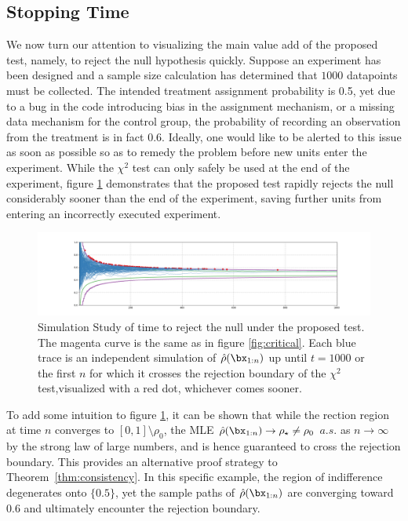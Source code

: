 \documentclass[11pt]{article}
\begin{document}
  \subsection{Stopping Time}
  We now turn our attention to visualizing the main value add of the proposed test, namely, to reject the null hypothesis quickly.
Suppose an experiment has been designed and a sample size calculation has determined that $1000$ datapoints must be collected.
The intended treatment assignment probability is 0.5, yet due to a bug in the code introducing bias in the assignment mechanism, or a missing data mechanism for the control group, the probability of recording an observation from the treatment is in fact 0.6.
Ideally, one would like to be alerted to this issue as soon as possible so as to remedy the problem before new units enter the experiment.
While the $\chi^2$ test can only safely be used at the end of the experiment,
  figure \ref{fig:ssrm_reject} demonstrates that the proposed test rapidly rejects the null considerably sooner than the end of the experiment, saving further units from entering an incorrectly executed experiment.
      \begin{figure}[H]
  \centering
  \includegraphics[scale=0.35]{images/ssrm_reject.png}
  \caption{Simulation Study of time to reject the null under the proposed test.
The magenta curve is the same as in figure \ref{fig:critical}.
Each blue trace is an independent simulation of $\hat{\rho}(\bx_{1:n})$ up until $t=1000$ or the first $n$ for which it crosses the rejection boundary of the $\chi^2$ test,visualized with a red dot, whichever comes sooner.
}
    \label{fig:ssrm_reject}
  \end{figure}
  \noindent To add some intuition to figure \ref{fig:ssrm_reject}, it can be shown that while the rection region at time $n$ converges to $[0,1]\setminus \rho_0$, the MLE $\hat{\rho}(\bx_{1:n}) \rightarrow \rho_\star \neq \rho_0$ $a.s.$ as $n\rightarrow \infty$ by the strong law of large numbers, and is hence guaranteed to cross the rejection boundary.
  This provides an alternative proof strategy to Theorem~\ref{thm:consistency}.
In this specific example, the region of indifference degenerates onto $\lbrace 0.5 \rbrace$, yet the sample paths of $\hat{\rho}(\bx_{1:n})$ are converging toward 0.6 and ultimately encounter the rejection boundary.
\end{document}

